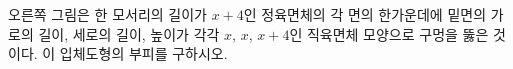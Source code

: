 \noindent\begin{minipage}[t]{0.58\linewidth}\vspace{0pt}\raggedright 오른쪽 그림은 한 모서리의 길이가 $x+4$인 정육면체의 각 면의 한가운데에 밑면의 가로의 길이, 세로의 길이, 높이가 각각 $x$, $x$, $x+4$인 직육면체 모양으로 구멍을 뚫은 것이다. 이 입체도형의 부피를 구하시오. \end{minipage}\hfill\begin{minipage}[t]{0.4\linewidth}\vspace{0pt}\centering \resizebox{\ifdim\width>\linewidth\linewidth\else\width\fi}{!}{}\end{minipage}\par

